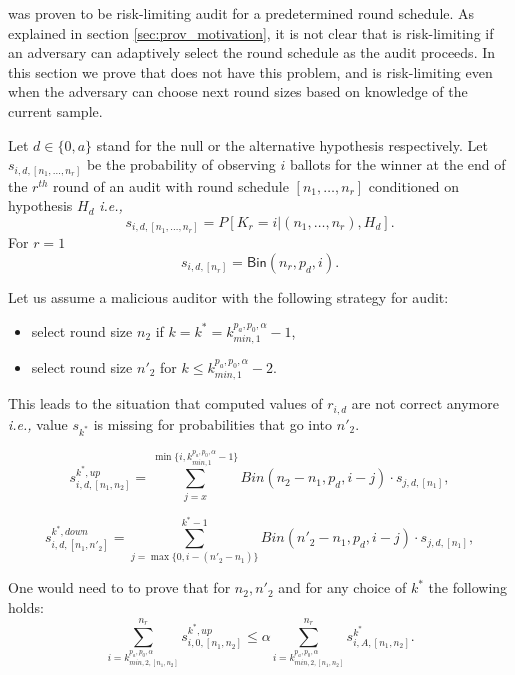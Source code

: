 

\Minerva was proven to be risk-limiting audit for a predetermined round schedule.
As explained in section \ref{sec:prov_motivation}, it is not clear that \Minerva is risk-limiting if an adversary can 
adaptively select the round schedule as the audit proceeds. In this section we prove that \Providence does not have this problem, and is risk-limiting even when the adversary can choose next round sizes based on knowledge of the current sample. 

\begin{definition}
Let $d \in \{0, a\}$ stand for the null or the alternative hypothesis respectively.
Let $s_{i, d, [n_1, \ldots, n_r]}$ be the probability of observing $i$ ballots for the winner at the end of the $r^{th}$ round of an audit with round schedule $[n_1, \ldots, n_r]$ conditioned on hypothesis $H_d$ \textit{i.e.,} 
\[
s_{i, d, [n_1, \ldots, n_r]} = P\left[K_r = i | (n_1, \ldots, n_r), H_d\right]. 
\]
For $r = 1$ 
\[
 s_{i, d, [n_r]} = \mathsf{Bin}(n_r, p_d, i).
\]
\end{definition}


\begin{example} 
Let us assume a malicious auditor with the following strategy for \Minerva audit:
\begin{itemize}
 \item select round size $n_2$ if $k = k^* = k^{p_a, p_0, \alpha}_{min, 1} - 1$,
 \item select round size $n'_2$ for $k \leq k^{p_a, p_0, \alpha}_{min, 1} - 2$.
\end{itemize}
This leads to the situation that computed values of $r_{i, d}$ are not correct anymore \textit{i.e.,} value $s_{k^*}$ is missing for probabilities that go into $n'_2$.

\[
 s^{k^*, up}_{i, d, [n_1, n_{2}]} = \sum_{j = x}^{\min\{i, k^{p_a, p_0, \alpha}_{min, 1}-1\}} Bin(n_{2} - n_1, p_d, i - j) \cdot s_{j, d, [n_1]},
\]

\[
 s^{k^*, down}_{i, d, [n_1, n'_{2}]} = \sum_{j = \max\{0, i - (n'_2 - n_1)\}}^{k^*-1} Bin(n'_{2} - n_1, p_d, i - j) \cdot s_{j, d, [n_1]},
\]

One would need to to prove that for $n_2, n'_2$ and for any choice of $k^*$ the following holds:
\[
\sum_{i = k^{p_a, p_0, \alpha}_{min, 2, [n_1, n_2]}}^{n_r} s^{k^*, up}_{i, 0, [n_1, n_2]} \le \alpha \sum_{i = k^{p_a, p_0, \alpha}_{min, 2, [n_1, n_2]}}^{n_r} s^{k^*}_{i, A, [n_1, n_2]}.
\]
\end{example}


